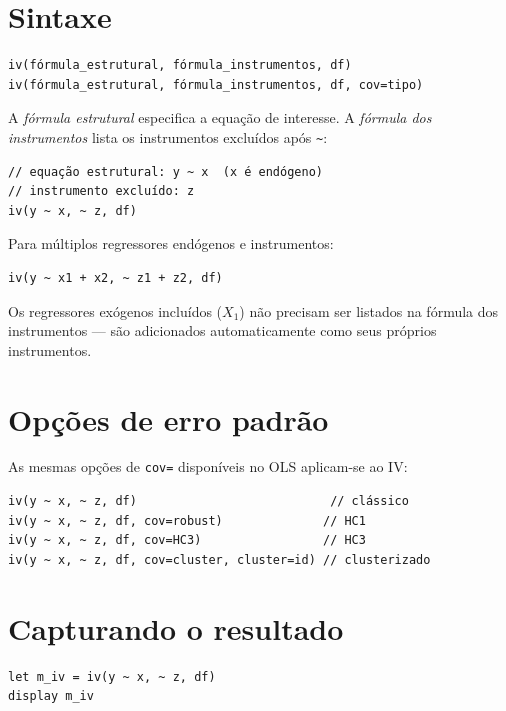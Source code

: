 \section{Sintaxe}

\begin{lstlisting}
iv(fórmula_estrutural, fórmula_instrumentos, df)
iv(fórmula_estrutural, fórmula_instrumentos, df, cov=tipo)
\end{lstlisting}

A \textit{fórmula estrutural} especifica a equação de interesse. A
\textit{fórmula dos instrumentos} lista os instrumentos excluídos após \lstinline{~}:

\begin{lstlisting}[caption={IV básico — um instrumento}]
// equação estrutural: y ~ x  (x é endógeno)
// instrumento excluído: z
iv(y ~ x, ~ z, df)
\end{lstlisting}

Para múltiplos regressores endógenos e instrumentos:

\begin{lstlisting}
iv(y ~ x1 + x2, ~ z1 + z2, df)
\end{lstlisting}

\begin{nota}
  Os regressores exógenos incluídos ($X_1$) não precisam ser listados na
  fórmula dos instrumentos — são adicionados automaticamente como seus
  próprios instrumentos.
\end{nota}

\section{Opções de erro padrão}

As mesmas opções de \lstinline{cov=} disponíveis no OLS aplicam-se ao IV:

\begin{lstlisting}
iv(y ~ x, ~ z, df)                           // clássico
iv(y ~ x, ~ z, df, cov=robust)              // HC1
iv(y ~ x, ~ z, df, cov=HC3)                 // HC3
iv(y ~ x, ~ z, df, cov=cluster, cluster=id) // clusterizado
\end{lstlisting}

\section{Capturando o resultado}

\begin{lstlisting}
let m_iv = iv(y ~ x, ~ z, df)
display m_iv
\end{lstlisting}

